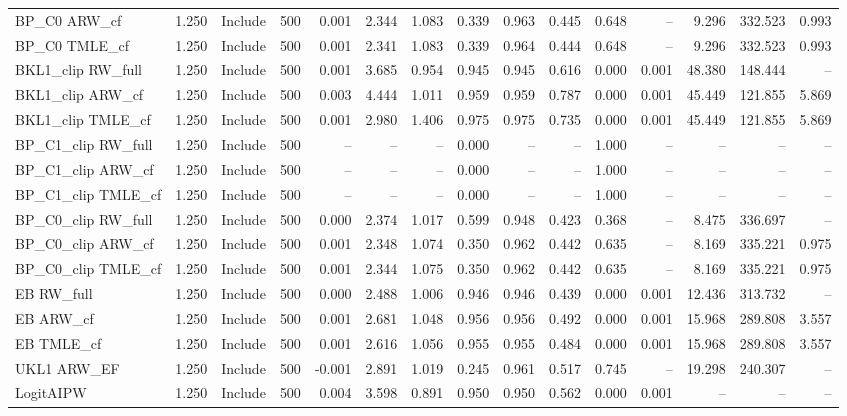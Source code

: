 \begin{tabular}{llllrrrrrrrrrrr}
BP\_C0 ARW\_cf & 1.250 & Include & 500 & 0.001 & 2.344 & 1.083 & 0.339 & 0.963 & 0.445 & 0.648 & -- & 9.296 & 332.523 & 0.993 \\
BP\_C0 TMLE\_cf & 1.250 & Include & 500 & 0.001 & 2.341 & 1.083 & 0.339 & 0.964 & 0.444 & 0.648 & -- & 9.296 & 332.523 & 0.993 \\
BKL1\_clip RW\_full & 1.250 & Include & 500 & 0.001 & 3.685 & 0.954 & 0.945 & 0.945 & 0.616 & 0.000 & 0.001 & 48.380 & 148.444 & -- \\
BKL1\_clip ARW\_cf & 1.250 & Include & 500 & 0.003 & 4.444 & 1.011 & 0.959 & 0.959 & 0.787 & 0.000 & 0.001 & 45.449 & 121.855 & 5.869 \\
BKL1\_clip TMLE\_cf & 1.250 & Include & 500 & 0.001 & 2.980 & 1.406 & 0.975 & 0.975 & 0.735 & 0.000 & 0.001 & 45.449 & 121.855 & 5.869 \\
BP\_C1\_clip RW\_full & 1.250 & Include & 500 & -- & -- & -- & 0.000 & -- & -- & 1.000 & -- & -- & -- & -- \\
BP\_C1\_clip ARW\_cf & 1.250 & Include & 500 & -- & -- & -- & 0.000 & -- & -- & 1.000 & -- & -- & -- & -- \\
BP\_C1\_clip TMLE\_cf & 1.250 & Include & 500 & -- & -- & -- & 0.000 & -- & -- & 1.000 & -- & -- & -- & -- \\
BP\_C0\_clip RW\_full & 1.250 & Include & 500 & 0.000 & 2.374 & 1.017 & 0.599 & 0.948 & 0.423 & 0.368 & -- & 8.475 & 336.697 & -- \\
BP\_C0\_clip ARW\_cf & 1.250 & Include & 500 & 0.001 & 2.348 & 1.074 & 0.350 & 0.962 & 0.442 & 0.635 & -- & 8.169 & 335.221 & 0.975 \\
BP\_C0\_clip TMLE\_cf & 1.250 & Include & 500 & 0.001 & 2.344 & 1.075 & 0.350 & 0.962 & 0.442 & 0.635 & -- & 8.169 & 335.221 & 0.975 \\
EB RW\_full & 1.250 & Include & 500 & 0.000 & 2.488 & 1.006 & 0.946 & 0.946 & 0.439 & 0.000 & 0.001 & 12.436 & 313.732 & -- \\
EB ARW\_cf & 1.250 & Include & 500 & 0.001 & 2.681 & 1.048 & 0.956 & 0.956 & 0.492 & 0.000 & 0.001 & 15.968 & 289.808 & 3.557 \\
EB TMLE\_cf & 1.250 & Include & 500 & 0.001 & 2.616 & 1.056 & 0.955 & 0.955 & 0.484 & 0.000 & 0.001 & 15.968 & 289.808 & 3.557 \\
UKL1 ARW\_EF & 1.250 & Include & 500 & -0.001 & 2.891 & 1.019 & 0.245 & 0.961 & 0.517 & 0.745 & -- & 19.298 & 240.307 & -- \\
LogitAIPW & 1.250 & Include & 500 & 0.004 & 3.598 & 0.891 & 0.950 & 0.950 & 0.562 & 0.000 & 0.001 & -- & -- & -- \\

\end{tabular}
